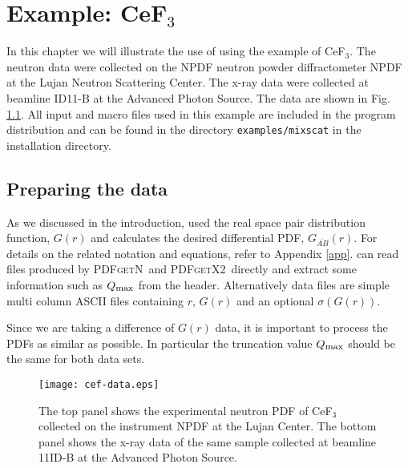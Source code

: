 
\chapter{Example: CeF$_3$\label{s:exa}}

In this chapter we will illustrate the use of \Mixscat using the example 
of CeF$_3$. The neutron data were collected on the NPDF neutron powder
diffractometer NPDF at the Lujan Neutron Scattering Center. The x-ray data
were collected at beamline ID11-B at the Advanced Photon Source. The 
data are shown in Fig. \ref{f:data}. All input and macro files used 
in this example are included in the program distribution and can be found 
in the directory {\tt examples/mixscat} in the installation directory.

\section{Preparing the data\label{s:exa:dat}}

As we discussed in the introduction, \Mixscat used the real space 
pair distribution function, $G(r)$ and calculates the desired differential
PDF, $G_{\overline{AB}}(r)$. For details on the related notation and 
equations, refer to Appendix \ref{app}. \Mixscat can read files produced by 
\textsc{PDFgetN}\,\citep{pdfgetn} and \textsc{PDFgetX2}\,\citep{pdfgetx2} 
directly and extract some information such as $Q_{\mbox{\footnotesize{max}}}
$ from the header. Alternatively data files are simple multi column ASCII
files containing $r$, $G(r)$ and an optional $\sigma(G(r))$.

Since we are taking a difference of $G(r)$ data, it is important to process 
the PDFs as similar as possible. In particular the truncation value $Q_
{\mbox{\footnotesize{max}}}$ should be the same for both data sets.

\begin{figure}[!bt]
  \centering
  \texttt{[image: cef-data.eps]}
  \caption{The top panel shows the experimental neutron PDF of CeF$_3$
  collected on the instrument NPDF at the Lujan Center. The bottom
  panel shows the x-ray data of the same sample collected at beamline
  11ID-B at the Advanced Photon Source.}
  \label{f:data}
\end{figure}

